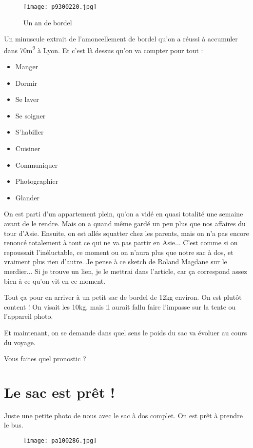 \documentclass{book}
\begin{document}
\begin{figure}[h]
\centering
\texttt{[image: p9300220.jpg]}
\caption*{ Un an de bordel}
\end{figure}

Un minuscule extrait de l'amoncellement de bordel qu'on a réussi à accumuler dans 70m\textsuperscript{2} à Lyon. Et c'est là dessus qu'on va compter pour tout :
\begin{itemize}
	\item Manger
	\item Dormir
	\item Se laver
	\item Se soigner
	\item S'habiller
	\item Cuisiner
	\item Communiquer
	\item Photographier
	\item Glander
\end{itemize}
On est parti d'un appartement plein, qu'on a vidé en quasi totalité une semaine avant de le rendre. Mais on a quand même gardé un peu plus que nos affaires du tour d'Asie. Ensuite, on est allés squatter chez les parents, mais on n'a pas encore renoncé totalement à tout ce qui ne va pas partir en Asie...
C'est comme si on repoussait l'inéluctable, ce moment ou on n'aura plus que notre sac à dos, et vraiment plus rien d'autre.
Je pense à ce sketch de Roland Magdane sur le merdier... Si je trouve un lien, je le mettrai dans l'article, car ça correspond assez bien à ce qu'on vit en ce moment.

Tout ça pour en arriver à un petit sac de bordel de 12kg environ. On est plutôt content ! On visait les 10kg, mais il aurait fallu faire l'impasse sur la tente ou l'appareil photo.

Et maintenant, on se demande dans quel sens le poids du sac va évoluer au cours du voyage.

Vous faites quel pronostic ?

\chapter{Le sac est prêt !}
Juste une petite photo de nous avec le sac à dos complet. On est prêt à prendre le bus.
\begin{figure}[h]
\centering
\texttt{[image: pa100286.jpg]}
\caption*{}
\end{figure}
\end{document}
